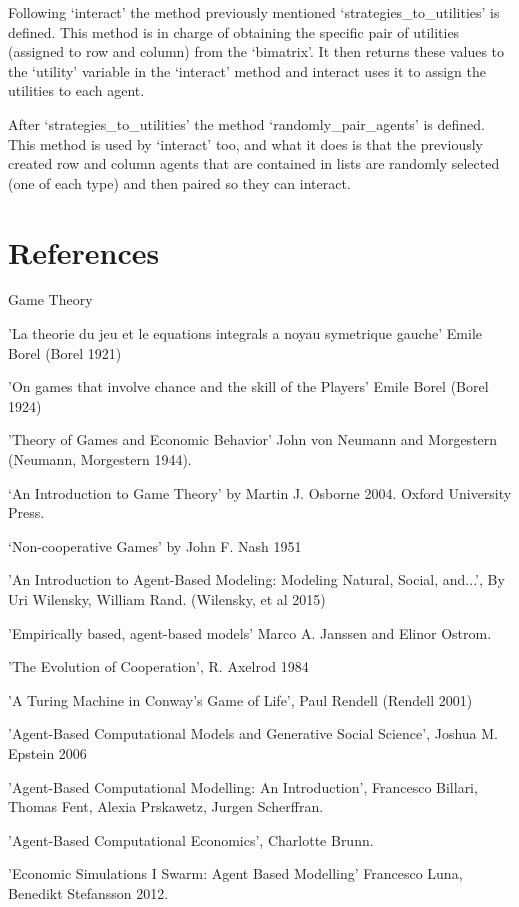 \documentclass{article}
\begin{document}
Following ‘interact’ the method previously mentioned ‘strategies\_to\_utilities’ is defined. This method is in charge of obtaining the specific pair of utilities (assigned to row and column) from the ‘bimatrix’. It then returns these values to the ‘utility’ variable in the ‘interact’ method and interact uses it to assign the utilities to each agent.

After ‘strategies\_to\_utilities’ the method ‘randomly\_pair\_agents’ is defined. This method is used by ‘interact’ too, and what it does is that the previously created row and column agents that are contained in lists are randomly selected (one of each type) and then paired so they can interact.


\section{References}

Game Theory

'La theorie du jeu et le equations integrals a noyau symetrique gauche' Emile Borel (Borel 1921)

'On games that involve chance and the skill of the Players' Emile Borel (Borel 1924)

'Theory of Games and Economic Behavior' John von Neumann and Morgestern (Neumann, Morgestern 1944).

‘An Introduction to Game Theory’ by Martin J. Osborne 2004. Oxford University Press.

‘Non-cooperative Games' by John F. Nash 1951

'An Introduction to Agent-Based Modeling: Modeling Natural, Social, and...', By Uri Wilensky, William Rand. (Wilensky, et al 2015)

'Empirically based, agent-based models' Marco A. Janssen and Elinor Ostrom.

'The Evolution of Cooperation', R. Axelrod 1984

'A Turing Machine in Conway’s Game of Life', Paul Rendell (Rendell 2001)

'Agent-Based Computational Models and Generative Social Science', Joshua M. Epstein 2006

'Agent-Based Computational Modelling: An Introduction', Francesco Billari, Thomas Fent, Alexia Prskawetz, Jurgen Scherffran.

'Agent-Based Computational Economics', Charlotte Brunn.

'Economic Simulations I Swarm: Agent Based Modelling' Francesco Luna, Benedikt Stefansson 2012.
\end{document}
